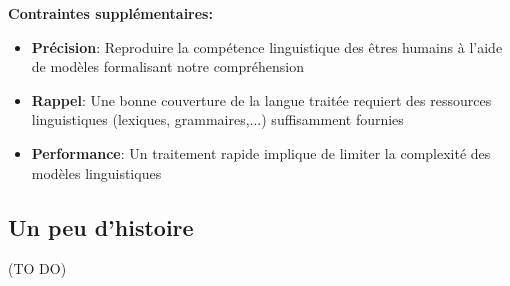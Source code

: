 \noindent\textbf{Contraintes supplémentaires:}

\begin{itemize}
    \item \textbf{Précision}: Reproduire la compétence linguistique des êtres humains à l'aide de modèles
    formalisant notre compréhension
    \item \textbf{Rappel}: Une bonne couverture de la langue traitée requiert des ressources
    linguistiques (lexiques, grammaires,...) suffisamment fournies
    \item \textbf{Performance}: Un traitement rapide implique de limiter la complexité des modèles linguistiques
\end{itemize}

\subsection{Un peu d'histoire}

(TO DO)
